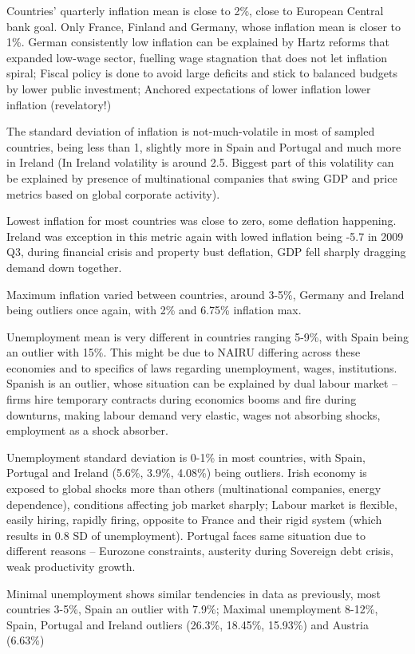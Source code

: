 \documentclass[preprint,10pt,authoryear]{elsarticle}
\begin{document}
Countries’ quarterly inflation mean is close to 2\%, close to European Central bank goal. Only France, Finland and Germany, whose inflation mean is closer to 1\%. German consistently low inflation can be explained by Hartz reforms that expanded low-wage sector, fuelling wage stagnation that does not let inflation spiral; Fiscal policy is done to avoid large deficits and stick to balanced budgets by lower public investment; Anchored expectations of lower inflation lower inflation (revelatory!) 

The standard deviation of inflation is not-much-volatile in most of sampled countries, being less than 1, slightly more in Spain and Portugal and much more in Ireland (In Ireland volatility is around 2.5. Biggest part of this volatility can be explained by presence of multinational companies that swing GDP and price metrics based on global corporate activity).  

Lowest inflation for most countries was close to zero, some deflation happening. Ireland was exception in this metric again with lowed inflation being -5.7 in 2009 Q3, during financial crisis and property bust deflation, GDP fell sharply dragging demand down together.  

Maximum inflation varied between countries, around 3-5\%, Germany and Ireland being outliers once again, with 2\% and 6.75\% inflation max.  

Unemployment mean is very different in countries ranging 5-9\%, with Spain being an outlier with 15\%. This might be due to NAIRU differing across these economies and to specifics of laws regarding unemployment, wages, institutions. Spanish is an outlier, whose situation can be explained by dual labour market – firms hire temporary contracts during economics booms and fire during downturns, making labour demand very elastic, wages not absorbing shocks, employment as a shock absorber.   

Unemployment standard deviation is 0-1\% in most countries, with Spain, Portugal and Ireland (5.6\%, 3.9\%, 4.08\%) being outliers. Irish economy is exposed to global shocks more than others (multinational companies, energy dependence), conditions affecting job market sharply; Labour market is flexible, easily hiring, rapidly firing, opposite to France and their rigid system (which results in 0.8 SD of unemployment). Portugal faces same situation due to different reasons – Eurozone constraints, austerity during Sovereign debt crisis, weak productivity growth. 

Minimal unemployment shows similar tendencies in data as previously, most countries 3-5\%, Spain an outlier with 7.9\%; Maximal unemployment 8-12\%, Spain, Portugal and Ireland outliers (26.3\%, 18.45\%, 15.93\%) and Austria (6.63\%)
\end{document}
